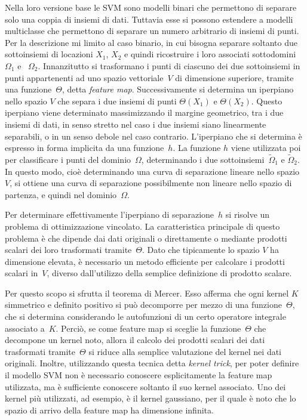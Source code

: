Nella loro versione base le SVM sono modelli binari che permettono di separare solo una coppia di insiemi di dati.  Tuttavia esse si possono estendere a modelli multiclasse che permettono di separare un numero arbitrario di insiemi di punti.
Per la descrizione mi limito al caso binario, in cui bisogna separare soltanto due sottoinsiemi di locazioni $X_1$, $X_2$ e quindi ricostruire i loro associati sottodomini $\Omega_1$ e ~$\Omega_2$.
Innanzitutto si trasformano i punti di ciascuno dei due sottoinsiemi in punti appartenenti ad  uno spazio vettoriale~$V$ di dimensione superiore, tramite una funzione~$\Theta$, detta {\em feature map}.  
 Successivamente si determina un iperpiano nello spazio $V$ che separa i due insiemi di punti $\Theta(X_1)$ e $\Theta(X_2)$.  Questo iperpiano viene determinato massimizzando il margine geometrico, tra i due insiemi di dati, in senso stretto nel caso i due insiemi siano linearmente separabili, o in un senso debole nel caso contrario.
L’iperpiano che si determina è espresso in forma implicita da una funzione~$h$.  La funzione $h$ viene utilizzata poi per classificare i punti del dominio~$\Omega$, determinando i due sottoinsiemi~$\tilde\Omega_1$ e $\tilde\Omega_2$.    
In questo modo, cioè determinando una curva di separazione lineare nello spazio~$V$, si ottiene una curva di separazione possibilmente non lineare nello spazio di partenza, e quindi nel dominio~$\Omega$. 



Per determinare effettivamente l’iperpiano di separazione~$h$ si risolve un problema di ottimizzazione vincolato.  La caratteristica principale di questo problema è che dipende dai dati originali o direttamente o  mediante prodotti scalari dei loro trasformati tramite~$\Theta$.   Dato che tipicamente lo spazio $V$ ha dimensione elevata, è necessario un metodo efficiente per calcolare i prodotti scalari in~$V$, diverso dall’utilizzo della semplice definizione di prodotto scalare.

Per questo scopo si sfrutta il teorema di Mercer.  Esso afferma che ogni kernel $K$ simmetrico e definito positivo si può decomporre per mezzo di una funzione~$\Theta$, che si determina considerando le autofunzioni di un certo operatore integrale associato a~$K$.  Perciò, se come feature map si sceglie la funzione~$\Theta$ che decompone un kernel noto, allora il calcolo dei prodotti scalari dei dati trasformati tramite~$\Theta$ si riduce alla semplice valutazione del kernel nei dati originali.  Inoltre, utilizzando questa tecnica detta {\em kernel trick}, per poter definire il modello SVM non è necessario conoscere esplicitamente la feature map utilizzata, ma è sufficiente conoscere soltanto il suo kernel associato.  Uno dei kernel più utilizzati, ad esempio, è il kernel gaussiano, per il quale è noto che lo spazio di arrivo della feature map ha dimensione infinita.




\bye
